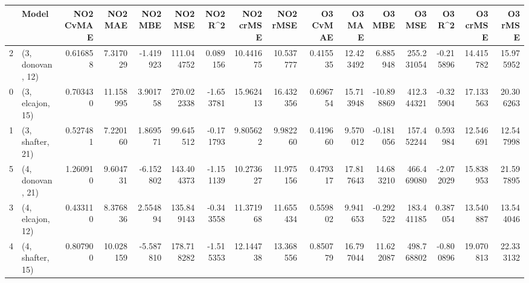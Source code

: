\begin{tabular}{llrrrrrrrrrrrrrr}
\toprule
{} &             Model &  NO2 CvMAE &    NO2 MAE &   NO2 MBE &     NO2 MSE &   NO2 R\textasciicircum2 &  NO2 crMSE &   NO2 rMSE &  O3 CvMAE &     O3 MAE &     O3 MBE &      O3 MSE &    O3 R\textasciicircum2 &   O3 crMSE &    O3 rMSE \\
\midrule
2 &  (3, donovan, 12) &   0.616858 &   7.317029 & -1.419923 &  111.044752 &  0.089156 &  10.441675 &  10.537777 &  0.415535 &  12.423492 &   6.885948 &  255.231054 & -0.215896 &  14.415782 &  15.975952 \\
0 &  (3, elcajon, 15) &   0.703430 &  11.158995 &  3.901758 &  270.022338 & -1.653781 &  15.962413 &  16.432356 &  0.696754 &  15.713948 & -10.898869 &  412.344321 & -0.325904 &  17.133563 &  20.306263 \\
1 &  (3, shafter, 21) &   0.527481 &   7.220160 &  1.869571 &   99.645512 & -0.171793 &   9.805622 &   9.982260 &  0.419660 &   9.570012 &  -0.181056 &  157.452244 &  0.593984 &  12.546691 &  12.547998 \\
5 &  (4, donovan, 21) &   1.260910 &   9.604731 & -6.152802 &  143.404373 & -1.151139 &  10.273627 &  11.975156 &  0.479317 &  17.817643 &  14.683210 &  466.469080 & -2.072029 &  15.838953 &  21.597895 \\
3 &  (4, elcajon, 12) &   0.433110 &   8.376836 &  2.554894 &  135.849143 & -0.343558 &  11.371968 &  11.655434 &  0.559802 &   9.941653 &  -0.292522 &  183.441185 &  0.387054 &  13.540887 &  13.544046 \\
4 &  (4, shafter, 15) &   0.807900 &  10.028159 & -5.587810 &  178.718282 & -1.515353 &  12.144738 &  13.368556 &  0.850779 &  16.797044 &  11.622087 &  498.768802 & -0.800896 &  19.070813 &  22.333132 \\
\bottomrule
\end{tabular}
